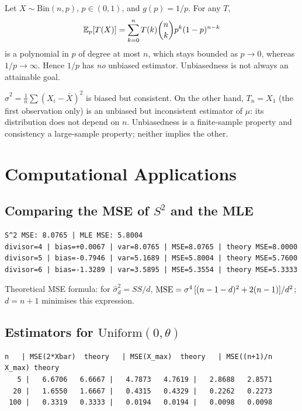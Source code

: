 \documentclass[main.tex]{subfiles}
\begin{document}
\begin{example}\label{ex:yansiz-yok}
Let $X\sim\text{Bin}(n,p)$, $p\in(0,1)$, and $g(p)=1/p$. For any $T$,
\[
\mathbb{E}_p[T(X)]=\sum_{k=0}^nT(k)\binom nk p^k(1-p)^{n-k}
\]
is a polynomial in $p$ of degree at most $n$, which stays bounded as $p\to0$, whereas $1/p\to\infty$. Hence $1/p$ has \emph{no} unbiased estimator. Unbiasedness is not always an attainable goal.
\end{example}

\begin{example}
$\hat\sigma^2=\frac1n\sum(X_i-\bar X)^2$ is biased but consistent. On the other hand, $T_n=X_1$ (the first observation only) is an unbiased but inconsistent estimator of $\mu$: its distribution does not depend on $n$. Unbiasedness is a finite-sample property and consistency a large-sample property; neither implies the other.
\end{example}

\section{Computational Applications}

\subsection{Comparing the MSE of $S^2$ and the MLE}

\begin{lstlisting}[style=output]
S^2 MSE: 8.0765 | MLE MSE: 5.8004
divisor=4 | bias=+0.0067 | var=8.0765 | MSE=8.0765 | theory MSE=8.0000
divisor=5 | bias=-0.7946 | var=5.1689 | MSE=5.8004 | theory MSE=5.7600
divisor=6 | bias=-1.3289 | var=3.5895 | MSE=5.3554 | theory MSE=5.3333
\end{lstlisting}

Theoretical MSE formula: for $\hat\sigma^2_d=SS/d$, $\operatorname{MSE}=\sigma^4\,[(n-1-d)^2+2(n-1)]/d^2$; $d=n+1$ minimises this expression.

\subsection{Estimators for $\text{Uniform}(0,\theta)$}

\begin{lstlisting}[style=output]
 n   | MSE(2*Xbar)  theory   | MSE(X_max)  theory   | MSE((n+1)/n X_max) theory
   5 |   6.6706   6.6667 |   4.7873   4.7619 |   2.8688   2.8571
  20 |   1.6550   1.6667 |   0.4315   0.4329 |   0.2262   0.2273
 100 |   0.3319   0.3333 |   0.0194   0.0194 |   0.0098   0.0098
\end{lstlisting}
\end{document}
